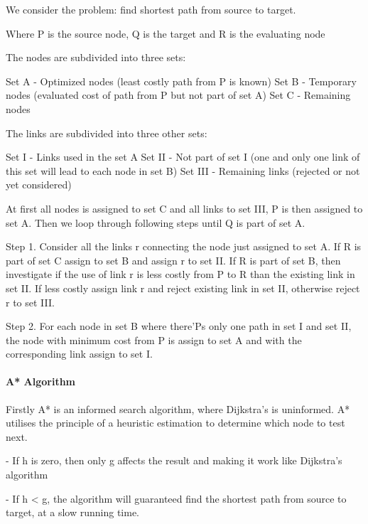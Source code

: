   We consider the problem: find shortest path from source to target.

  Where P is the source node, Q is the target and R is the evaluating node

  The nodes are subdivided into three sets:

  Set A - Optimized nodes (least costly path from P is known)
  Set B - Temporary nodes (evaluated cost of path from P but not part of set A)
  Set C - Remaining nodes

  The links are subdivided into three other sets:

  Set I - Links used in the set A
  Set II - Not part of set I (one and only one link of this set will lead to each node in set B)
  Set III - Remaining links (rejected or not yet considered)

  At first all nodes is assigned to set C and all links to set III, P is then assigned to set A.
  Then we loop through following steps until Q is part of set A.

  Step 1. Consider all the links r connecting the node just assigned to set A. If R is part of set C assign to set B and assign r to set II.
  If R is part of set B, then investigate if the use of link r is less costly from P to R than the existing link in set II. If less costly assign link r and reject existing link in set II, otherwise reject r to set III.

  Step 2. For each node in set B where there'Ps only one path in set I and set II, the node with minimum cost from P is assign to set A and with the corresponding link assign to set I.



  \paragraph{A* Algorithm}

  Firstly A* is an informed search algorithm, where Dijkstra's is uninformed. A* utilises the principle of a heuristic estimation to determine which node to test next.

  - If h is zero, then only g affects the result and making it work like Dijkstra's algorithm

  - If h < g, the algorithm will guaranteed find the shortest path from source to target, at a slow running time.

